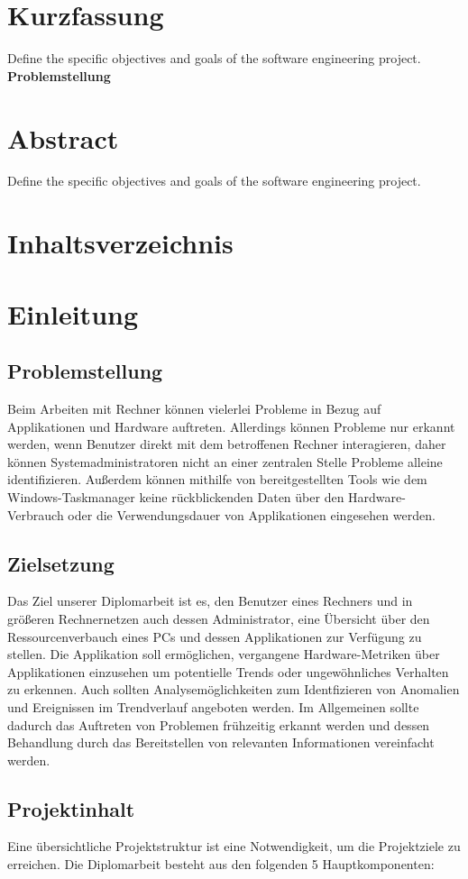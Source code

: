\documentclass{report}
\begin{document}
\chapter*{Kurzfassung}
Define the specific objectives and goals of the software engineering project.
\textbf{Problemstellung} 

\chapter*{Abstract}
Define the specific objectives and goals of the software engineering project.

\chapter*{Inhaltsverzeichnis}

\chapter{Einleitung}
\section{Problemstellung}
Beim Arbeiten mit Rechner können vielerlei Probleme in Bezug auf Applikationen und Hardware auftreten. Allerdings können Probleme nur erkannt werden, wenn Benutzer direkt mit dem betroffenen Rechner interagieren, daher können Systemadministratoren nicht an einer zentralen Stelle Probleme alleine identifizieren. Außerdem können mithilfe von bereitgestellten Tools wie dem Windows-Taskmanager keine rückblickenden Daten über den Hardware-Verbrauch oder die Verwendungsdauer von Applikationen eingesehen werden.
\section{Zielsetzung}
Das Ziel unserer Diplomarbeit ist es, den Benutzer eines Rechners und in größeren Rechnernetzen auch dessen Administrator, eine Übersicht über den Ressourcenverbauch eines PCs und dessen Applikationen zur Verfügung zu stellen. Die Applikation soll ermöglichen, vergangene Hardware-Metriken über Applikationen einzusehen um potentielle Trends oder ungewöhnliches Verhalten zu erkennen. Auch sollten Analysemöglichkeiten zum Identfizieren von Anomalien und Ereignissen im Trendverlauf angeboten werden. Im Allgemeinen sollte dadurch das Auftreten von Problemen frühzeitig erkannt werden und dessen Behandlung durch das Bereitstellen von relevanten Informationen vereinfacht werden.
\section{Projektinhalt}
Eine übersichtliche Projektstruktur ist eine Notwendigkeit, um die Projektziele zu erreichen. Die Diplomarbeit besteht aus den folgenden 5 Hauptkomponenten:
\end{document}
